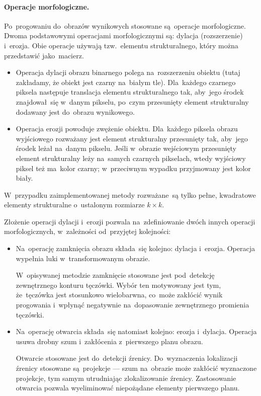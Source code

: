 \documentclass[11pt,a4paper]{article}
\begin{document}
\paragraph{Operacje morfologiczne.}
Po~progowaniu do~obrazów wynikowych stosowane są~operacje morfologiczne.
Dwoma podstawowymi operacjami morfologicznymi są: dylacja (rozszerzenie) i~erozja.
Obie operacje używają tzw.~elementu strukturalnego, który można przedstawić jako~macierz.
\begin{itemize}
    \item Operacja dylacji obrazu binarnego polega na~rozszerzeniu obiektu (tutaj zakładamy, że obiekt jest czarny na~białym tle).
    Dla~każdego czarnego piksela następuje translacja elementu strukturalnego tak, aby~jego środek znajdował~się w~danym pikselu, po~czym przesunięty element strukturalny dodawany jest do~obrazu wynikowego.
    \item Operacja erozji powoduje zwężenie obiektu.
    Dla~każdego piksela obrazu wyjściowego rozważany jest element strukturalny przesunięty tak, aby~jego środek leżał na~danym pikselu.
    Jeśli w~obrazie wejściowym przesunięty element strukturalny leży na~samych czarnych pikselach, wtedy wyjściowy piksel też ma~kolor czarny; w~przeciwnym wypadku przyjmowany jest kolor biały.
\end{itemize}
W~przypadku zaimplementowanej metody rozważane~są tylko pełne, kwadratowe elementy strukturalne o~ustalonym rozmiarze $k \times k$.

Złożenie operacji dylacji i~erozji pozwala na~zdefiniowanie dwóch innych operacji morfologicznych, w~zależności od~przyjętej kolejności:
\begin{itemize}
    \item Na~operację zamknięcia obrazu składa~się kolejno: dylacja i~erozja.
    Operacja wypełnia luki w~transformowanym obrazie.

    W~opisywanej metodzie zamknięcie stosowane jest pod~detekcję zewnętrznego konturu tęczówki.
    Wybór ten motywowany jest tym, że~tęczówka jest stosunkowo wielobarwna, co~może zakłócić wynik progowania i~wpłynąć negatywnie na~dopasowanie zewnętrznego promienia tęczówki.
    \item Na~operację otwarcia składa~się natomiast kolejno: erozja i~dylacja.
    Operacja usuwa drobny szum i~zakłócenia z~pierwszego planu obrazu.

    Otwarcie stosowane jest do~detekcji źrenicy.
    Do~wyznaczenia lokalizacji źrenicy stosowane są~projekcje --- szum na~obrazie może zakłócić wyznaczone projekcje, tym samym utrudniając zlokalizowanie źrenicy.
    Zastosowanie otwarcia pozwala wyeliminować niepożądane elementy pierwszego planu.
\end{itemize}
\end{document}
